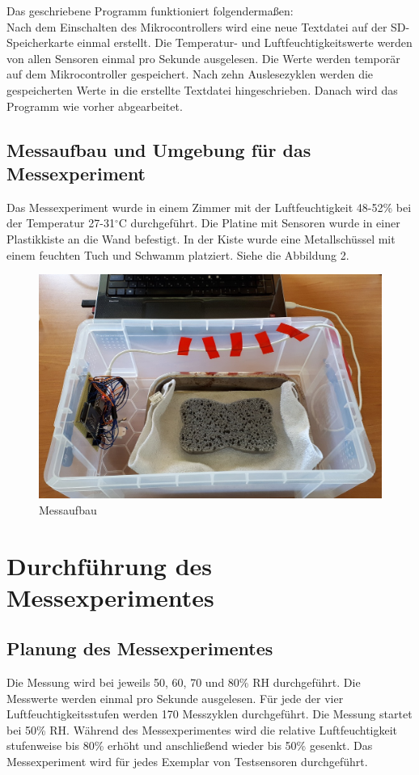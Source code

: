 \documentclass[runningheads]{llncs}
\begin{document}
Das geschriebene Programm funktioniert folgendermaßen:\\ Nach dem Einschalten des Mikrocontrollers wird eine neue Textdatei auf der SD-Speicherkarte einmal erstellt. Die Temperatur- und Luftfeuchtigkeitswerte werden von allen Sensoren einmal pro Sekunde ausgelesen. Die Werte werden temporär auf dem Mikrocontroller gespeichert. Nach zehn Auslesezyklen werden die gespeicherten Werte in die erstellte Textdatei hingeschrieben. Danach wird das Programm wie vorher abgearbeitet.
\subsection{Messaufbau und Umgebung für das Messexperiment}
Das Messexperiment wurde in einem Zimmer mit der Luftfeuchtigkeit 48-52\% bei der Temperatur 27-31$^\circ$C durchgeführt. Die Platine mit Sensoren wurde in einer Plastikkiste an die Wand befestigt. In der Kiste wurde eine Metallschüssel mit einem feuchten Tuch und Schwamm platziert. Siehe die Abbildung 2.  
\begin{figure}[h]
\includegraphics[width=\textwidth]{pictures/messaufbau.jpg}
\caption{Messaufbau}
\end{figure}
\section{Durchführung des Messexperimentes}
\subsection{Planung des Messexperimentes}
Die Messung wird bei jeweils 50, 60, 70 und 80\% RH durchgeführt. Die Messwerte werden einmal pro Sekunde ausgelesen. Für jede der vier Luftfeuchtigkeitsstufen werden 170 Messzyklen durchgeführt. Die Messung startet bei 50\% RH. Während des Messexperimentes wird die relative Luftfeuchtigkeit stufenweise bis 80\% erhöht und anschließend wieder bis 50\% gesenkt. Das Messexperiment wird für jedes Exemplar von Testsensoren durchgeführt.
\end{document}
